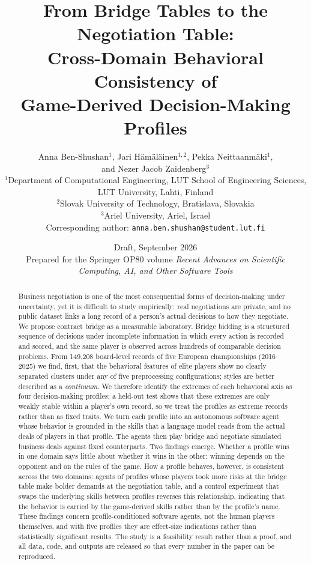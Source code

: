 \documentclass[11pt,a4paper]{article}
\title{\color{navy}\textbf{From Bridge Tables to the Negotiation Table:\\
Cross-Domain Behavioral Consistency of\\ Game-Derived Decision-Making Profiles}}
\author{Anna Ben-Shushan$^{1}$, Jari H\"am\"al\"ainen$^{1,2}$, Pekka Neittaanm\"aki$^{1}$,\\
and Nezer Jacob Zaidenberg$^{3}$\\[6pt]
\small $^{1}$Department of Computational Engineering, LUT School of Engineering Sciences,\\
\small LUT University, Lahti, Finland\\[2pt]
\small $^{2}$Slovak University of Technology, Bratislava, Slovakia\\[2pt]
\small $^{3}$Ariel University, Ariel, Israel\\[4pt]
\small Corresponding author: \texttt{anna.ben.shushan@student.lut.fi}}
\date{\small Draft, September 2026 \\[2pt]
\footnotesize Prepared for the Springer OP80 volume
\emph{Recent Advances on Scientific Computing, AI, and Other Software Tools}}
\begin{document}
\maketitle

\begin{abstract}
\noindent
Business negotiation is one of the most consequential forms of
decision-making under uncertainty, yet it is difficult to study
empirically: real negotiations are private, and no public dataset links
a long record of a person's actual decisions to how they negotiate. We
propose contract bridge as a measurable laboratory. Bridge bidding is a
structured sequence of decisions under incomplete information in which
every action is recorded and scored, and the same player is observed
across hundreds of comparable decision problems. From 149{,}208
board-level records of five European championships (2016--2025) we
find, first, that the behavioral features of elite players show no
clearly separated clusters under any of five preprocessing
configurations; styles are better described as a \emph{continuum}. We
therefore identify the extremes of each behavioral axis as four
decision-making profiles; a held-out test shows that these extremes
are only weakly stable within a player's own record, so we treat the
profiles as extreme records rather than as fixed traits. We turn each
profile into an autonomous software agent whose behavior is grounded
in the skills that a language model reads from the actual deals of
players in that profile. The
agents then play bridge and negotiate simulated business deals against
fixed counterparts. Two findings emerge. Whether a profile wins in one
domain says little about whether it wins in the other: winning depends
on the opponent and on the rules of the game. How a profile behaves,
however, is consistent across the two domains: agents of profiles whose
players took more risks at the bridge table make bolder demands at the
negotiation table, and a control experiment that swaps the underlying
skills between profiles reverses this relationship, indicating that the
behavior is carried by the game-derived skills rather than by the
profile's name. These findings concern profile-conditioned software
agents, not the human players themselves, and with five profiles they
are effect-size indications rather than statistically significant
results. The study is a feasibility result rather than a proof, and all
data, code, and outputs are released so that every number in the paper
can be reproduced.
\end{abstract}
\end{document}
